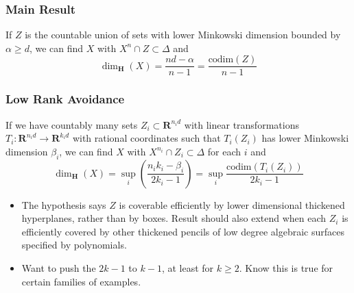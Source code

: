 \documentclass[usenames,dvipsnames]{beamer}
\begin{document}
\begin{frame}
    \frametitle{Main Result}

    \begin{theorem}
        If $Z$ is the countable union of sets with lower Minkowski dimension bounded by $\alpha \geq d$, we can find $X$ with $X^n \cap Z \subset \Delta$ and
        \[ \dim_{\mathbf{H}}(X) = \frac{nd - \alpha}{n - 1} = \frac{\text{codim}(Z)}{n - 1} \]
    \end{theorem}

\end{frame}

\begin{frame}
    \frametitle{Low Rank Avoidance}

    \begin{theorem}
        If we have countably many sets $Z_i \subset \mathbf{R}^{n_id}$ with linear transformations $T_i: \mathbf{R}^{n_id} \to \mathbf{R}^{k_i d}$ with rational coordinates such that $T_i(Z_i)$ has lower Minkowski dimension $\beta_i$, we can find $X$ with $X^{n_i} \cap Z_i \subset \Delta$ for each $i$ and
        \[ \dim_{\mathbf{H}}(X) = \sup_i \left( \frac{n_ik_i - \beta_i}{2k_i - 1} \right) = \sup_i \frac{\text{codim}(T_i(Z_i))}{2k_i - 1} \]
    \end{theorem}

    \begin{itemize}
        \item The hypothesis says $Z$ is coverable efficiently by lower dimensional thickened hyperplanes, rather than by boxes. Result should also extend when each $Z_i$ is efficiently covered by other thickened pencils of low degree algebraic surfaces specified by polynomials.

        \item Want to push the $2k - 1$ to $k - 1$, at least for $k \geq 2$. Know this is true for certain families of examples.
    \end{itemize}
\end{frame}
\end{document}

